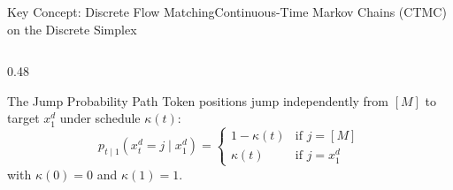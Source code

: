 \documentclass[aspectratio=169, 10pt]{beamer}
\begin{document}
\begin{frame}{Key Concept: Discrete Flow Matching}{Continuous-Time Markov Chains (CTMC) on the Discrete Simplex}
\begin{columns}[T]
\begin{column}{0.48\textwidth}
  \begin{exampleblock}{\scriptsize The Jump Probability Path}
    \scriptsize
    Token positions jump independently from $[M]$ to target $x_1^d$ under schedule $\kappa(t)$:
    \begin{equation*}
      p_{t \mid 1}(x_t^d = j \mid x_1^d) = 
      \begin{cases}
        1 - \kappa(t) & \text{if } j = [M] \\
        \kappa(t) & \text{if } j = x_1^d
      \end{cases}
    \end{equation*}
    with $\kappa(0) = 0$ and $\kappa(1) = 1$.
  \end{exampleblock}
  \vspace{0.1cm}
\end{column}
\end{columns}
\end{frame}
\end{document}
